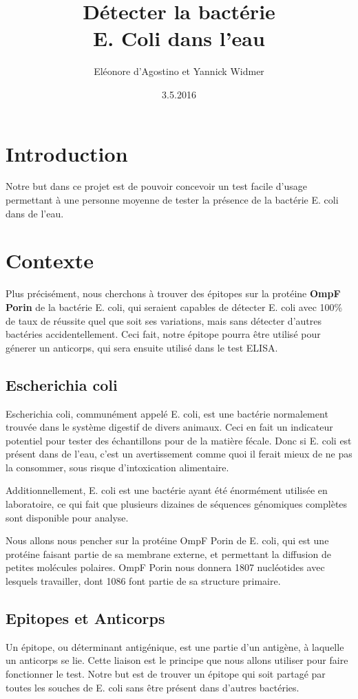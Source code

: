\documentclass{article}
\title{Détecter la bactérie\\ {\huge E. Coli} dans l'eau}
\date{3.5.2016}
\author{Eléonore d'Agostino et Yannick Widmer}
\begin{document}
  \maketitle
  \tableofcontents
  \newpage
  
  \section{Introduction}
    Notre but dans ce projet est de pouvoir concevoir un test facile d'usage permettant à une personne moyenne de tester la présence de la bactérie E. coli dans de l'eau.\\    
  \section{Contexte}
    Plus précisément, nous cherchons à trouver des épitopes sur la protéine \textbf{OmpF Porin} de la bactérie E. coli, qui seraient capables de détecter E. coli avec 100\% de taux de réussite quel que soit ses variations, mais sans détecter d'autres bactéries accidentellement. Ceci fait, notre épitope pourra être utilisé pour génerer un anticorps, qui sera ensuite utilisé dans le test ELISA.
    
    \subsection{Escherichia coli}
      Escherichia coli, communément appelé E. coli, est une bactérie normalement trouvée dans le système digestif de divers animaux. Ceci en fait un indicateur potentiel pour tester des échantillons pour de la matière fécale. Donc si E. coli est présent dans de l'eau, c'est un avertissement comme quoi il ferait mieux de ne pas la consommer, sous risque d'intoxication alimentaire.
      
      Additionnellement, E. coli est une bactérie ayant été énormément utilisée en laboratoire, ce qui fait que plusieurs dizaines de séquences génomiques complètes sont disponible pour analyse.
      
      Nous allons nous pencher sur la protéine OmpF Porin de E. coli, qui est une protéine faisant partie de sa membrane externe, et permettant la diffusion de petites molécules polaires. OmpF Porin nous donnera 1807 nucléotides avec lesquels travailler, dont 1086 font partie de sa structure primaire.
      
    \subsection{Epitopes et Anticorps}
      Un épitope, ou déterminant antigénique, est une partie d'un antigène, à laquelle un anticorps se lie. Cette liaison est le principe que nous allons utiliser pour faire fonctionner le test. Notre but est de trouver un épitope qui soit partagé par toutes les souches de E. coli sans être présent dans d'autres bactéries.
      
\end{document}
